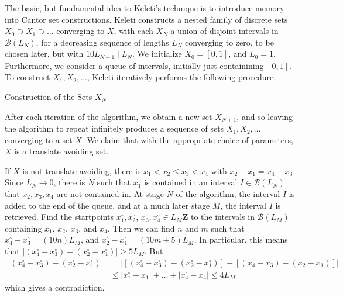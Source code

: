 The basic, but fundamental idea to Keleti's technique is to introduce memory into Cantor set constructions. Keleti constructs a nested family of discrete sets $X_0 \supset X_1 \supset \dots$ converging to $X$, with each $X_N$ a union of disjoint intervals in $\mathcal{B}(L_N)$, for a decreasing sequence of lengths $L_N$ converging to zero, to be chosen later, but with $10 L_{N+1} \mid L_N$. We initialize $X_0 = [0,1]$, and $L_0 = 1$. Furthermore, we consider a queue of intervals, initially just containining $[0,1]$. To construct $X_1, X_2, \dots$, Keleti iteratively performs the following procedure:
%
\begin{algorithm}
    \begin{algorithmic}%
        \caption{Construction of the Sets $X_N$}
        \MRepeat


            \EndForAll
        \EndRepeat   
    \end{algorithmic}
\end{algorithm}

After each iteration of the algorithm, we obtain a new set $X_{N+1}$, and so leaving the algorithm to repeat infinitely produces a sequence of sets $X_1, X_2, \dots$ converging to a set $X$. We claim that with the appropriate choice of parameters, $X$ is a translate avoiding set.

If $X$ is not translate avoiding, there is $x_1 < x_2 \leq x_3 < x_4$ with $x_2 - x_1 = x_4 - x_3$. Since $L_N \to 0$, there is $N$ such that $x_1$ is contained in an interval $I \in \mathcal{B}(L_N)$ that $x_2,x_3, x_4$ are not contained in. At stage $N$ of the algorithm, the interval $I$ is added to the end of the queue, and at a much later stage $M$, the interval $I$ is retrieved. Find the startpoints $x_1^\circ, x_2^\circ$, $x_3^\circ, x_4^\circ \in L_M \mathbf{Z}$ to the intervals in $\mathcal{B}(L_M)$ containing $x_1$, $x_2$, $x_3$, and $x_4$. Then we can find $n$ and $m$ such that $x_4^\circ - x_3^\circ = (10n)L_M$, and $x_2^\circ - x_1^\circ = (10m + 5)L_M$. In particular, this means that $|(x_4^\circ - x_3^\circ) - (x_2^\circ - x_1^\circ)| \geq 5L_M$. But
%
\begin{align*}
    |(x_4^\circ - x_3^\circ) - (x_2^\circ - x_1^\circ)| &= |[(x_4^\circ - x_3^\circ) - (x_2^\circ - x_1^\circ)] - [(x_4 - x_3) - (x_2 - x_1)]|\\
    &\leq |x_1^\circ - x_1| + \dots + |x_4^\circ - x_4| \leq 4 L_M
\end{align*}
%
which gives a contradiction.

